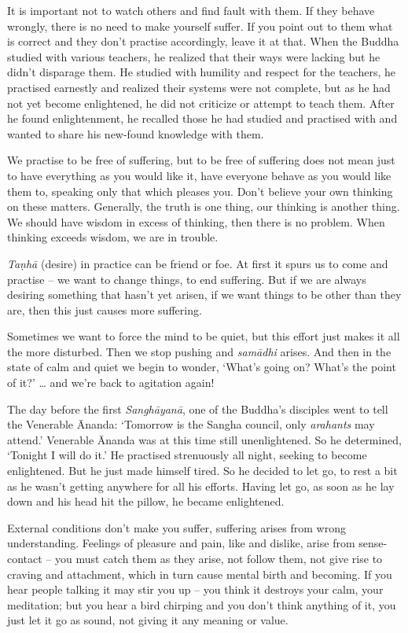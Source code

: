 It is important not to watch others and find fault with them. If they
behave wrongly, there is no need to make yourself suffer. If you point
out to them what is correct and they don't practise accordingly, leave
it at that. When the Buddha studied with various teachers, he realized
that their ways were lacking but he didn't disparage them. He studied
with humility and respect for the teachers, he practised earnestly and
realized their systems were not complete, but as he had not yet become
enlightened, he did not criticize or attempt to teach them. After he
found enlightenment, he recalled those he had studied and practised with
and wanted to share his new-found knowledge with them. 

We practise to be free of suffering, but to be free of suffering does
not mean just to have everything as you would like it, have everyone
behave as you would like them to, speaking only that which pleases you. 
Don't believe your own thinking on these matters. Generally, the truth
is one thing, our thinking is another thing. We should have wisdom in
excess of thinking, then there is no problem. When thinking exceeds
wisdom, we are in trouble. 

\emph{Taṇhā} (desire) in practice can be friend or foe. At first it
spurs us to come and practise -- we want to change things, to end
suffering. But if we are always desiring something that hasn't yet
arisen, if we want things to be other than they are, then this just
causes more suffering. 

Sometimes we want to force the mind to be quiet, but this effort just
makes it all the more disturbed. Then we stop pushing and \emph{samādhi}
arises. And then in the state of calm and quiet we begin to
wonder, `What's going on? What's the point of it?' \ldots{} and we're
back to agitation again! 

The day before the first \emph{Sanghāyanā}, one of the Buddha's
disciples went to tell the Venerable Ānanda: `Tomorrow is the Sangha
council, only \emph{arahants} may attend.' Venerable Ānanda was at this
time still unenlightened. So he determined, `Tonight I will do it.' He
practised strenuously all night, seeking to become enlightened. But he
just made himself tired. So he decided to let go, to rest a bit as he
wasn't getting anywhere for all his efforts. Having let go, as soon as
he lay down and his head hit the pillow, he became enlightened. 

External conditions don't make you suffer, suffering arises from wrong
understanding. Feelings of pleasure and pain, like and dislike, arise
from sense-contact -- you must catch them as they arise, not follow
them, not give rise to craving and attachment, which in turn cause
mental birth and becoming. If you hear people talking it may stir you up
-- you think it destroys your calm, your meditation; but you hear a bird
chirping and you don't think anything of it, you just let it go as
sound, not giving it any meaning or value. 

